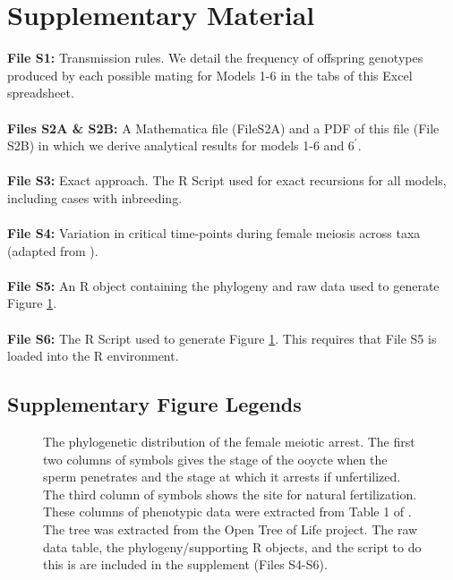\documentclass[12pt,letterpaper]{article}
\begin{document}
\clearpage
\newpage
  \setcounter{figure}{0}\global{}

\section*{Supplementary Material}

{\bf{File S1:}} Transmission rules. We detail the frequency of offspring genotypes produced by each possible mating for Models 1-6 in the tabs of this Excel spreadsheet. 
\\ \\
{\bf{Files S2A \& S2B:}} A Mathematica file (FileS2A) and a PDF of this file (File S2B) in which we derive analytical results for models 1-6 and $6^\prime$. 
\\ \\
{\bf{File S3:}} Exact approach. The R Script used for exact recursions for all models, including cases with inbreeding.
\\ \\
{\bf{File S4:}} Variation in critical time-points during female meiosis across taxa (adapted from \citet{Masui_book}).
\\ \\
{\bf{File S5:}} An R object containing the phylogeny and raw data used to generate Figure \ref{Meiotic_fig}.
\\ \\
{\bf{File S6:}} The R Script used to generate Figure \ref{Meiotic_fig}. This requires that File S5 is loaded into the R environment.
\clearpage

\newpage
\subsection*{Supplementary Figure Legends}
\clearpage


\begin{figure}
\caption{The phylogenetic distribution of the female meiotic
  arrest. The first two columns of symbols gives the stage of the ooycte when
  the sperm penetrates and the stage at which it arrests if
  unfertilized. The third column of symbols shows the site for natural fertilization. 
  These columns of phenotypic data were extracted from Table
  1 of \citet{Masui_book}. The tree was extracted from the Open Tree of
Life project. The raw data table, the phylogeny/supporting R objects, and the script to do this is are included in
the supplement (Files S4-S6). }  
\label{Meiotic_fig}
\end{figure}
\end{document}
